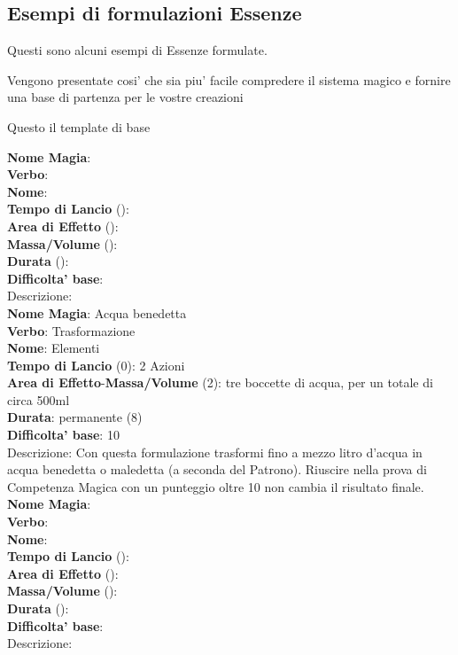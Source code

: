 \subsection{Esempi di formulazioni Essenze}

Questi sono alcuni esempi di Essenze formulate.

Vengono presentate cosi' che sia piu' facile compredere il sistema magico e fornire una base di partenza per le vostre creazioni


Questo il template di base


\flushleft \textbf{Nome Magia}: \\ 
\textbf{Verbo}: \\
\textbf{Nome}: \\
\textbf{Tempo di Lancio} (): \\
\textbf{Area di Effetto} (): \\
\textbf{Massa/Volume} (): \\
\textbf{Durata} (): \\
\textbf{Difficolta' base}: \\
Descrizione: \\


\flushleft \textbf{Nome Magia}: Acqua benedetta\\  
\textbf{Verbo}: Trasformazione\\
\textbf{Nome}: Elementi\\
\textbf{Tempo di Lancio} (0): 2 Azioni\\
\textbf{Area di Effetto}-\textbf{Massa/Volume} (2): tre boccette di acqua, per un totale di circa 500ml\\
\textbf{Durata}: permanente (8)\\
\textbf{Difficolta' base}: 10\\
Descrizione: Con questa formulazione trasformi fino a mezzo litro d'acqua in acqua benedetta o maledetta (a seconda del Patrono). Riuscire nella prova di Competenza Magica con un punteggio oltre 10 non cambia il risultato finale.\\


\flushleft \textbf{Nome Magia}: \\ 
\textbf{Verbo}: \\
\textbf{Nome}: \\
\textbf{Tempo di Lancio} (): \\
\textbf{Area di Effetto} (): \\
\textbf{Massa/Volume} (): \\
\textbf{Durata} (): \\
\textbf{Difficolta' base}: \\
Descrizione: \\

